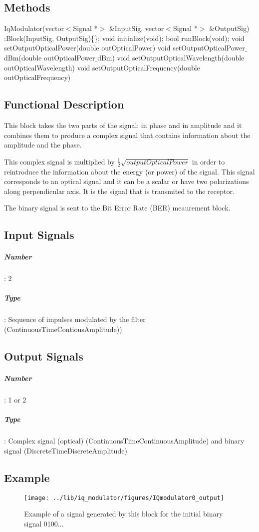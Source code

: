 \subsection*{Methods}

IqModulator(vector$<$Signal *$>$ \&InputSig, vector$<$Signal *$>$ \&OutputSig) :Block(InputSig, OutputSig)\{\};
\bigbreak
void initialize(void);
\bigbreak
bool runBlock(void);
\bigbreak
void setOutputOpticalPower(double outOpticalPower)
\bigbreak
void setOutputOpticalPower$\_$dBm(double outOpticalPower$\_$dBm)
\bigbreak
void setOutputOpticalWavelength(double outOpticalWavelength)
\bigbreak
void setOutputOpticalFrequency(double outOpticalFrequency)

\subsection*{Functional Description}

This block takes the two parts of the signal: in phase and in amplitude and it combines them to produce a complex signal that contains information about the amplitude and the phase.

This complex signal is multiplied by $\frac{1}{2}\sqrt{\textit{outputOpticalPower}}$ in order to reintroduce the information about the energy (or power) of the signal. This signal corresponds to an optical signal and it can be a scalar or have two polarizations along perpendicular axis. It is the signal that is transmited to the receptor.

The binary signal is sent to the Bit Error Rate (BER) meaurement block.

\subsection*{Input Signals}

\subparagraph*{Number}: 2

\subparagraph*{Type}: Sequence of impulses modulated by the filter (ContinuousTimeContiousAmplitude))

\subsection*{Output Signals}

\subparagraph*{Number}: 1 or 2

\subparagraph*{Type}: Complex signal (optical) (ContinuousTimeContinuousAmplitude) and binary signal (DiscreteTimeDiscreteAmplitude)

\subsection*{Example}
\begin{figure}[h]
	\centering
	\texttt{[image: ../lib/iq\_modulator/figures/IQmodulator0\_output]}
	\label{MQAM8_DeterministicAppendZeros}\caption{Example of a signal generated by this block for the initial binary signal 0100...}
\end{figure}


